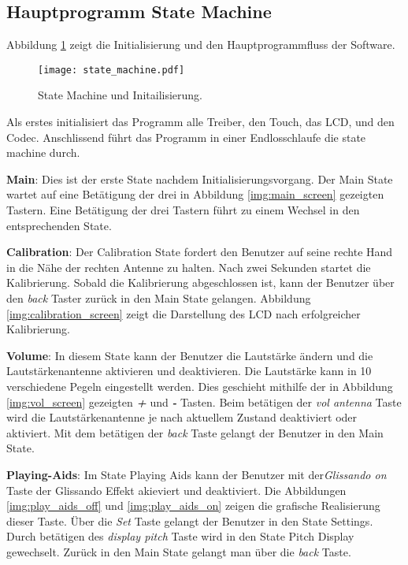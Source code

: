 \subsection{Hauptprogramm State Machine}\label{subsec:State_Machine}
Abbildung \ref{img:state_machine} zeigt die Initialisierung und den Hauptprogrammfluss der Software.
\begin{figure}[h]
	\centering
	\texttt{[image: state\_machine.pdf]}
	\caption{State Machine und Initailisierung.}
	\label{img:state_machine}
\end{figure}

Als erstes initialisiert das Programm alle Treiber, den Touch, das LCD, und den Codec. Anschlissend führt das Programm in einer Endlosschlaufe die state machine durch.

\textbf{Main}:
Dies ist der erste State nachdem Initialisierungsvorgang. Der Main State wartet auf eine Betätigung der drei in Abbildung \ref{img:main_screen} gezeigten Tastern. Eine Betätigung der drei Tastern führt zu einem Wechsel in den entsprechenden State. 
 
\textbf{Calibration}:
Der Calibration State fordert den Benutzer auf seine rechte Hand in die Nähe der rechten Antenne zu halten.
Nach zwei Sekunden startet die Kalibrierung. Sobald die Kalibrierung abgeschlossen ist, kann der Benutzer über den \textit{back} Taster zurück in den Main State gelangen. Abbildung \ref{img:calibration_screen} zeigt die Darstellung des LCD nach erfolgreicher Kalibrierung.

\textbf{Volume}:
In diesem State kann der Benutzer die Lautstärke ändern und die Lautstärkenantenne aktivieren und deaktivieren. Die Lautstärke kann in 10 verschiedene Pegeln eingestellt werden. Dies geschieht mithilfe der in Abbildung \ref{img:vol_screen} gezeigten \textbf{\textit{+}} und \textbf{\textit{-}} Tasten. Beim betätigen der \textit{vol antenna} Taste wird die Lautstärkenantenne je nach aktuellem Zustand deaktiviert oder aktiviert. Mit dem betätigen der \textit{back} Taste gelangt der Benutzer in den Main State.
 
\textbf{Playing-Aids}:
Im State Playing Aids kann der Benutzer mit der\textit{Glissando on} Taste der Glissando Effekt akieviert und deaktiviert. Die Abbildungen \ref{img:play_aids_off} und \ref{img:play_aids_on} zeigen die grafische Realisierung dieser Taste. Über die \textit{Set} Taste gelangt der Benutzer in den State Settings. Durch betätigen des \textit{display pitch} Taste wird in den State Pitch Display gewechselt. Zurück in den Main State gelangt man über die \textit{back} Taste.

